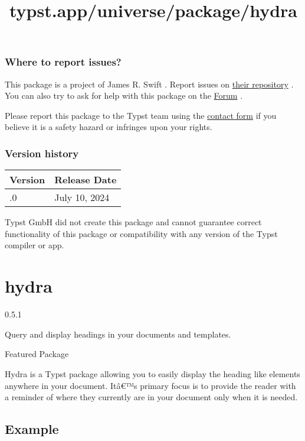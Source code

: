 \subsubsection{Where to report issues?}\label{where-to-report-issues}

This package is a project of James R. Swift . Report issues on
\href{https://github.com/JamesxX/dining-table}{their repository} . You
can also try to ask for help with this package on the
\href{https://forum.typst.app}{Forum} .

Please report this package to the Typst team using the
\href{https://typst.app/contact}{contact form} if you believe it is a
safety hazard or infringes upon your rights.

\label{versions}
\subsubsection{Version history}\label{version-history}

\begin{longtable}[]{@{}ll@{}}
\toprule\noalign{}
Version & Release Date \\
\midrule\noalign{}
\endhead
\bottomrule\noalign{}
\endlastfoot
0.1.0 & July 10, 2024 \\
\end{longtable}

Typst GmbH did not create this package and cannot guarantee correct
functionality of this package or compatibility with any version of the
Typst compiler or app.


\title{typst.app/universe/package/hydra}

\label{banner}
\section{hydra}\label{hydra}

{ 0.5.1 }

Query and display headings in your documents and templates.

{ } Featured Package

\label{readme}
Hydra is a Typst package allowing you to easily display the heading like
elements anywhere in your document. Itâ€™s primary focus is to provide
the reader with a reminder of where they currently are in your document
only when it is needed.

\subsection{Example}\label{example}


